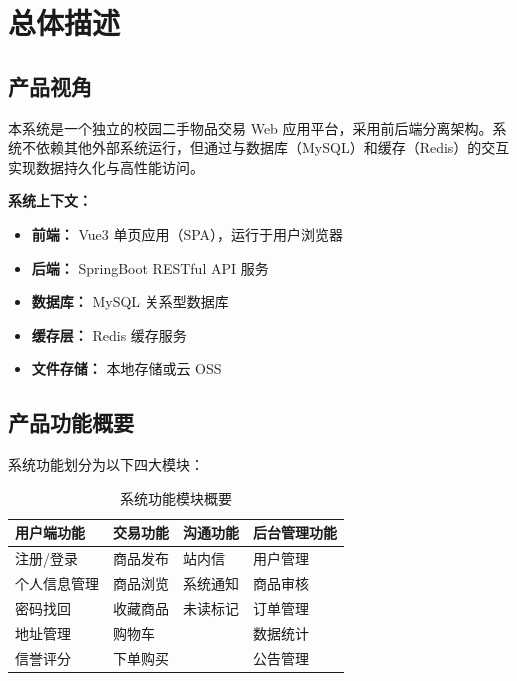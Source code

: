 \documentclass[12pt,a4paper,UTF8]{ctexart}
\begin{document}
\section{总体描述}

\subsection{产品视角}

本系统是一个独立的校园二手物品交易 Web 应用平台，采用前后端分离架构。系统不依赖其他外部系统运行，但通过与数据库（MySQL）和缓存（Redis）的交互实现数据持久化与高性能访问。

\textbf{系统上下文：}
\begin{itemize}[itemsep=3pt]
    \item \textbf{前端：} Vue3 单页应用（SPA），运行于用户浏览器
    \item \textbf{后端：} SpringBoot RESTful API 服务
    \item \textbf{数据库：} MySQL 关系型数据库
    \item \textbf{缓存层：} Redis 缓存服务
    \item \textbf{文件存储：} 本地存储或云 OSS
\end{itemize}

\subsection{产品功能概要}

系统功能划分为以下四大模块：

\begin{table}[H]
    \centering
    \begin{tabularx}{\textwidth}{|X|X|X|X|}
        \hline
        \textbf{用户端功能} & \textbf{交易功能} & \textbf{沟通功能} & \textbf{后台管理功能} \\
        \hline
        注册/登录 & 商品发布 & 站内信 & 用户管理 \\
        个人信息管理 & 商品浏览 & 系统通知 & 商品审核 \\
        密码找回 & 收藏商品 & 未读标记 & 订单管理 \\
        地址管理 & 购物车 &  & 数据统计 \\
        信誉评分 & 下单购买 &  & 公告管理 \\
        \hline
    \end{tabularx}
    \caption{系统功能模块概要}
\end{table}
\end{document}
